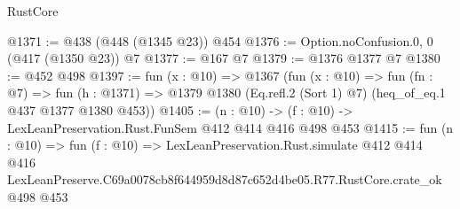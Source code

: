 \begin{lexlean}{RustCore}
\begin{coremodule}
@1371 := @438 (@448 (@1345 @23)) @454
@1376 := Option.noConfusion.{0, 0} (@417 (@1350 @23)) @7
@1377 := @167 @7
@1379 := @1376 @1377 @7
@1380 := @452 @498
@1397 := fun (x : @10) =>
  @1367
    (fun (x : @10) =>
    fun (fn : @7) =>
    fun (h : @1371) => @1379 @1380 (Eq.refl.{2} (Sort 1) @7) (heq_of_eq.{1} @437 @1377 @1380 @453))
@1405 := (n : @10) -> (f : @10) -> LexLeanPreservation.Rust.FunSem @412 @414 @416 @498 @453
@1415 := fun (n : @10) =>
  fun (f : @10) =>
  LexLeanPreservation.Rust.simulate
    @412
    @414
    @416
    LexLeanPreserve.C69a0078cb8f644959d8d87c652d4be05.R77.RustCore.crate_ok
    @498
    @453
\end{coremodule}
\end{lexlean}
